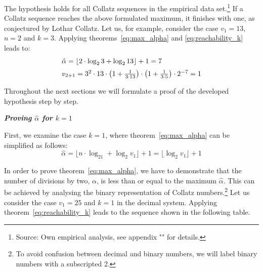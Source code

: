 \documentclass{SciPress_2015}
\renewcommand{\subsection}[1]{\textit{\textbf{#1}}}
\begin{document}
The hypothesis holds for all Collatz sequences in the empirical data set.\footnote{Source: Own empirical analysis, see appendix "" for details.} If a Collatz sequence reaches the above formulated maximum, it finishes with one, as conjectured by Lothar Collatz. Let us, for example, consider the case $v_1=13$, $n=2$ and $k=3$. Applying theorems~\ref{eq:max_alpha} and \ref{eq:reachability_k} leads to:
\[
\begin{array}{l}
\hat\alpha=\lfloor 2\cdot\log_23+\log_213\rfloor+1=7\\[\medskipamount]
v_{2+1}=3^2\cdot 13\cdot\left(1+\frac{1}{3\cdot13}\right)\cdot\left(1+\frac{1}{3\cdot5}\right)\cdot2^{-7}=1
\end{array}
\]

\par\noindent
Throughout the next sections we will formulate a proof of the developed hypothesis step by step.

\vspace{1em}\noindent
\subsection{Proving \boldmath$\hat\alpha$ for \boldmath$k=1$}
\par\noindent
First, we examine the case $k=1$, where theorem~\ref{eq:max_alpha} can be simplified as follows:
\begin{equation}
\label{eq:max_alpha_1}
\hat\alpha=\lfloor n\cdot\log_21+\log_2v_1\rfloor+1=\lfloor\log_2v_1\rfloor+1
\end{equation}

\par\noindent
In order to prove theorem~\ref{eq:max_alpha}, we have to demonstrate that the number of divisions by two, $\alpha$, is less than or equal to the maximum $\hat\alpha$. This can be achieved by analysing the binary representation of Collatz numbers.\footnote{To avoid confusion between decimal and binary numbers, we will label binary numbers with a subscripted $2$.} Let us consider the case $v_1=25$ and $k=1$ in the decimal system. Applying theorem~\ref{eq:reachability_k} leads to the sequence shown in the following table.
\end{document}
